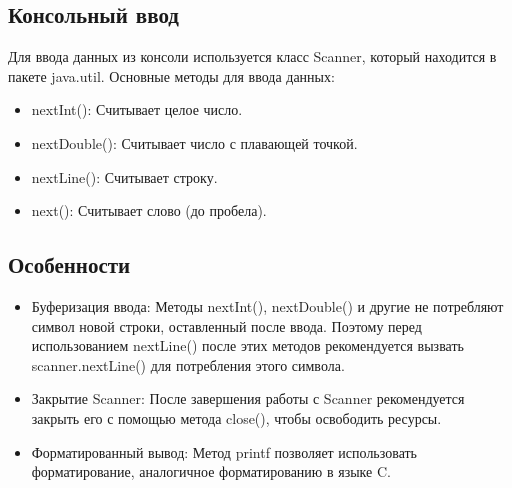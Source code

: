 \documentclass[12pt, a4paper]{article}
\begin{document}
\subsection*{Консольный ввод}
Для ввода данных из консоли используется класс Scanner, который находится в пакете java.util. Основные методы для ввода данных:
\begin{itemize}
    \item nextInt(): Считывает целое число.
    \item nextDouble(): Считывает число с плавающей точкой.
    \item nextLine(): Считывает строку.
    \item next(): Считывает слово (до пробела).
\end{itemize}

\subsection*{Особенности}
\begin{itemize}
    \item Буферизация ввода: Методы nextInt(), nextDouble() и другие не потребляют символ новой строки, оставленный после ввода. Поэтому перед использованием nextLine() после этих методов рекомендуется вызвать scanner.nextLine() для потребления этого символа.
    \item Закрытие Scanner: После завершения работы с Scanner рекомендуется закрыть его с помощью метода close(), чтобы освободить ресурсы.
    \item Форматированный вывод: Метод printf позволяет использовать форматирование, аналогичное форматированию в языке C.
\end{itemize}
\end{document}
